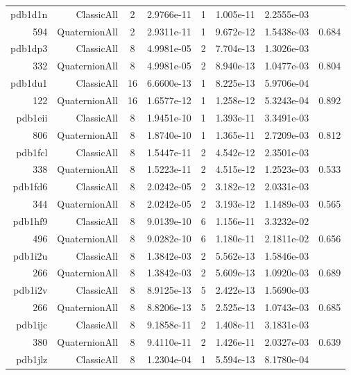 \begin{xltabular}{\textwidth}{r|rcS[table-format=1.4e+2]cS[table-format=1.3e+2]S[table-format=1.4e+2]S[table-format=-1.3]}
pdb1d1n & ClassicAll & 2 & 2.9766e-11 & 1 & 1.005e-11 & 2.2555e-03 & \\
594 & QuaternionAll & 2 & 2.9311e-11 & 1 & 9.672e-12 & 1.5438e-03 & 0.684\\  \addlinespace
pdb1dp3 & ClassicAll & 8 & 4.9981e-05 & 2 & 7.704e-13 & 1.3026e-03 & \\
332 & QuaternionAll & 8 & 4.9981e-05 & 2 & 8.940e-13 & 1.0477e-03 & 0.804\\  \addlinespace
pdb1du1 & ClassicAll & 16 & 6.6600e-13 & 1 & 8.225e-13 & 5.9706e-04 & \\
122 & QuaternionAll & 16 & 1.6577e-12 & 1 & 1.258e-12 & 5.3243e-04 & 0.892\\  \addlinespace
pdb1eii & ClassicAll & 8 & 1.9451e-10 & 1 & 1.393e-11 & 3.3491e-03 & \\
806 & QuaternionAll & 8 & 1.8740e-10 & 1 & 1.365e-11 & 2.7209e-03 & 0.812\\  \addlinespace
pdb1fcl & ClassicAll & 8 & 1.5447e-11 & 2 & 4.542e-12 & 2.3501e-03 & \\
338 & QuaternionAll & 8 & 1.5223e-11 & 2 & 4.515e-12 & 1.2523e-03 & 0.533\\  \addlinespace
pdb1fd6 & ClassicAll & 8 & 2.0242e-05 & 2 & 3.182e-12 & 2.0331e-03 & \\
344 & QuaternionAll & 8 & 2.0242e-05 & 2 & 3.193e-12 & 1.1489e-03 & 0.565\\  \addlinespace
pdb1hf9 & ClassicAll & 8 & 9.0139e-10 & 6 & 1.156e-11 & 3.3232e-02 & \\
496 & QuaternionAll & 8 & 9.0282e-10 & 6 & 1.180e-11 & 2.1811e-02 & 0.656\\  \addlinespace
pdb1i2u & ClassicAll & 8 & 1.3842e-03 & 2 & 5.562e-13 & 1.5846e-03 & \\
266 & QuaternionAll & 8 & 1.3842e-03 & 2 & 5.609e-13 & 1.0920e-03 & 0.689\\  \addlinespace
pdb1i2v & ClassicAll & 8 & 8.9125e-13 & 5 & 2.422e-13 & 1.5690e-03 & \\
266 & QuaternionAll & 8 & 8.8206e-13 & 5 & 2.525e-13 & 1.0743e-03 & 0.685\\  \addlinespace
pdb1ijc & ClassicAll & 8 & 9.1858e-11 & 2 & 1.408e-11 & 3.1831e-03 & \\
380 & QuaternionAll & 8 & 9.4110e-11 & 2 & 1.426e-11 & 2.0327e-03 & 0.639\\  \addlinespace
pdb1jlz & ClassicAll & 8 & 1.2304e-04 & 1 & 5.594e-13 & 8.1780e-04 & \\

\end{xltabular}
